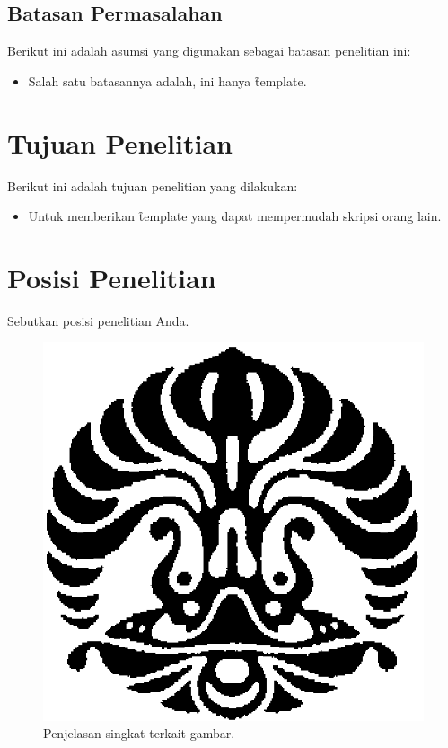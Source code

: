 \subsection{Batasan Permasalahan}
Berikut ini adalah asumsi yang digunakan sebagai batasan penelitian ini:
\begin{itemize}
	\item Salah satu batasannya adalah, ini hanya \f{template}.
\end{itemize}


\section{Tujuan Penelitian}
Berikut ini adalah tujuan penelitian yang dilakukan:
\begin{itemize}
	\item Untuk memberikan \f{template} yang dapat mempermudah skripsi orang lain.
\end{itemize}


\section{Posisi Penelitian}
Sebutkan posisi penelitian Anda.

\begin{figure}
	\centering
	\includegraphics[width=\textwidth]{assets/pics/makara.png}
	\caption{Penjelasan singkat terkait gambar.}
	\label{fig:research_position}
\end{figure}

